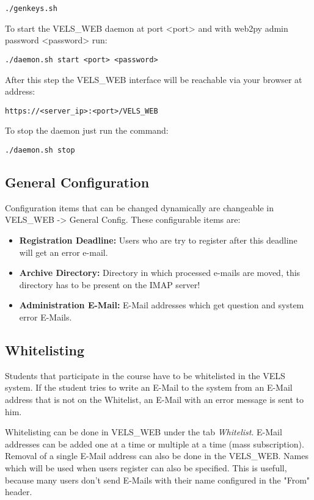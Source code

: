 \begin{verbatim}
./genkeys.sh    
\end{verbatim}

To start the VELS\_WEB daemon at port <port> and with web2py admin password 
<password> run:
\begin{verbatim}
./daemon.sh start <port> <password> 
\end{verbatim}

After this step the VELS\_WEB interface will be reachable via your browser at
address:
\begin{verbatim}
https://<server_ip>:<port>/VELS_WEB
\end{verbatim}

To stop the daemon just run the command:

\begin{verbatim}
./daemon.sh stop
\end{verbatim}

\subsection{General Configuration}\label{sub:generalconfig}
Configuration items that can be changed dynamically are changeable in VELS\_WEB ->
General Config. These configurable items are:
\begin{itemize}
\item {\bf Registration Deadline:} Users who are try to register after this deadline will
    get an error e-mail.
\item {\bf Archive Directory:} Directory in which processed e-mails are moved, this
    directory has to be present on the IMAP server!
\item {\bf Administration E-Mail:} E-Mail addresses which get question and system error E-Mails.

\end{itemize}

\subsection{Whitelisting} \label{sub:whitelisting}
Students that participate in the course have to be whitelisted in the VELS system. If the student
tries to write an E-Mail to the system from an E-Mail address that is not on the Whitelist, an E-Mail
with an error message is sent to him.

Whitelisting can be done in VELS\_WEB under the tab {\it Whitelist}. E-Mail addresses can be added
one at a time or multiple at a time (mass subscription). Removal of a single E-Mail address
can also be done in the VELS\_WEB. Names which will be used when users register can also be 
specified. This is usefull, because many users don't send E-Mails with their name configured
in the "From" header.

